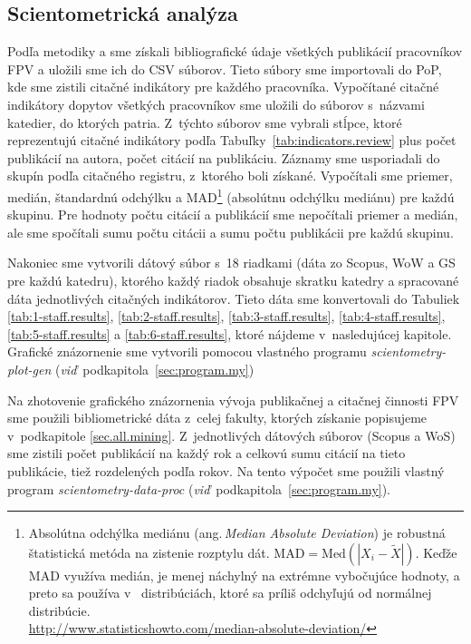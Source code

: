 \subsection{Scientometrická analýza}

Podľa metodiky \citet{Kazakis2014a} a \citet{Kazakis2014b,Kazakis2015} sme
získali bibliografické údaje všetkých publikácií pracovníkov FPV a uložili sme
ich do CSV súborov.  Tieto súbory sme importovali do PoP, kde sme zistili
citačné indikátory pre každého pracovníka.  Vypočítané citačné indikátory
dopytov všetkých pracovníkov sme uložili do súborov s~názvami katedier, do
ktorých patria.  Z~týchto súborov sme vybrali stĺpce, ktoré reprezentujú citačné
indikátory podľa Tabuľky~\ref{tab:indicators.review} plus počet publikácií na
autora, počet citácií na publikáciu.  Záznamy sme usporiadali do skupín podľa
citačného registru, z~ktorého boli získané.  Vypočítali sme priemer, medián,
štandardnú odchýlku a MAD\footnote{Absolútna odchýlka mediánu
  (ang.\,\emph{Median Absolute Deviation}) je robustná štatistická metóda na
  zistenie rozptylu dát.  $\mathrm{MAD} = \mathrm{Med}(|X_i - \tilde{X}|)$.
  Keďže MAD využíva medián, je menej náchylný na extrémne vybočujúce hodnoty, a
  preto sa používa v~ distribúciách, ktoré sa príliš odchyľujú od normálnej
  distribúcie.\\\url{http://www.statisticshowto.com/median-absolute-deviation/}}
(absolútnu odchýlku mediánu) pre každú skupinu.  Pre hodnoty počtu citácií a
publikácií sme nepočítali priemer a medián, ale sme spočítali sumu počtu citácii
a sumu počtu publikácii pre každú skupinu.

Nakoniec sme vytvorili dátový súbor s~18 riadkami (dáta zo Scopus, WoW a GS pre
každú katedru), ktorého každý riadok obsahuje skratku katedry a spracované dáta
jednotlivých citačných indikátorov.  Tieto dáta sme konvertovali do Tabuliek
\ref{tab:1-staff.results}, \ref{tab:2-staff.results}, \ref{tab:3-staff.results},
\ref{tab:4-staff.results}, \ref{tab:5-staff.results} a
\ref{tab:6-staff.results}, ktoré nájdeme v~nasledujúcej kapitole.  Grafické
znázornenie sme vytvorili pomocou vlastného programu
\emph{scientometry-plot-gen} (\emph{viď}~podkapitola~\ref{sec:program.my})

Na zhotovenie grafického znázornenia vývoja publikačnej a citačnej činnosti FPV
sme použili bibliometrické dáta z~celej fakulty, ktorých získanie popisujeme
v~podkapitole \ref{sec.all.mining}.  Z~jednotlivých dátových súborov (Scopus a
WoS) sme zistili počet publikácií na každý rok a celkovú sumu citácií na tieto
publikácie, tiež rozdelených podľa rokov.  Na tento výpočet sme použili vlastný
program \emph{scientometry-data-proc}
(\emph{viď}~podkapitola~\ref{sec:program.my}).

